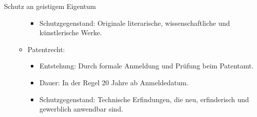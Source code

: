 \documentclass{article}
\begin{document}
\begin{exercise}{Schutz an geistigem Eigentum}
\begin{solution}
\begin{enumerate}
\begin{itemize}
\begin{itemize}
                      \item Schutzgegenstand: Originale literarische, wissenschaftliche und künstlerische Werke.
                    \end{itemize}
              \item Patentrecht:
                    \begin{itemize}
                      \item Entstehung: Durch formale Anmeldung und Prüfung beim Patentamt.
                      \item Dauer: In der Regel 20 Jahre ab Anmeldedatum.
                      \item Schutzgegenstand: Technische Erfindungen, die neu, erfinderisch und gewerblich anwendbar sind.
                    \end{itemize}
            \end{itemize}
    \end{enumerate}
  \end{solution}
\end{exercise}
\end{document}
